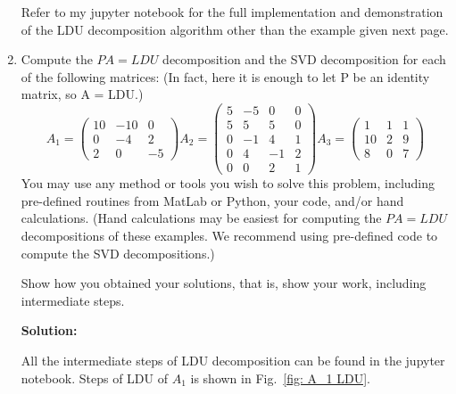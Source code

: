 \documentclass[conference,onecolumn]{IEEEtran}
\begin{document}
\begin{enumerate}[label=\arabic{enumi}.]
          Refer to my jupyter notebook for the full implementation and demonstration of the LDU decomposition algorithm other than the example given next page.

          \clearpage
    \item Compute the $PA = LDU$ decomposition and the SVD decomposition for each of the following matrices: (In fact, here it is enough to let P be an identity matrix, so A = LDU.)
          \begin{equation*}
              A_1 =
              \begin{pmatrix}
                  10 & -10 & 0  \\
                  0  & -4  & 2  \\
                  2  & 0   & -5
              \end{pmatrix}
              A_2 =
              \begin{pmatrix}
                  5 & -5 & 0  & 0 \\
                  5 & 5  & 5  & 0 \\
                  0 & -1 & 4  & 1 \\
                  0 & 4  & -1 & 2 \\
                  0 & 0  & 2  & 1
              \end{pmatrix}
              A_3 =
              \begin{pmatrix}
                  1  & 1 & 1 \\
                  10 & 2 & 9 \\
                  8  & 0 & 7
              \end{pmatrix}
          \end{equation*}
          You may use any method or tools you wish to solve this problem, including pre-defined
          routines from MatLab or Python, your code, and/or hand calculations.
          (Hand calculations may be easiest for computing the $PA = LDU$ decompositions of these examples. We recommend using pre-defined code to compute the SVD decompositions.)

          Show how you obtained your solutions, that is, show your work, including intermediate steps.

          \textbf{Solution:}

          All the intermediate steps of LDU decomposition can be found in the jupyter notebook.
          Steps of LDU of $A_1$ is shown in Fig.~\ref{fig: A_1 LDU}.


\end{enumerate}
\end{document}
